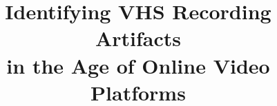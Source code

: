 \documentclass{sig-alternate}
\begin{document}
%
\crdata{}  %

\title{Identifying VHS Recording Artifacts\\
in the Age of Online Video Platforms}

%
%
%
%
\end{document}
